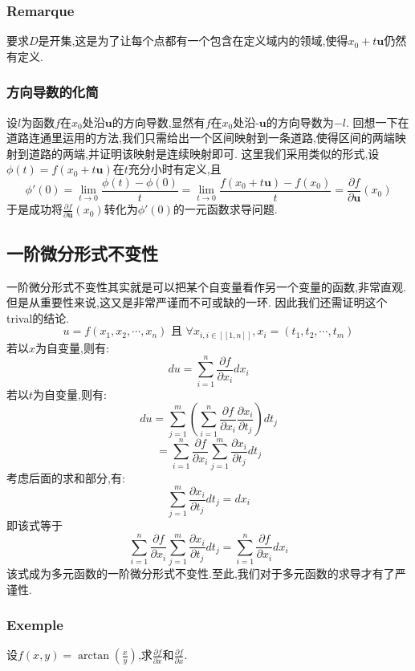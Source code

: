 \documentclass[12pt, a4paper, oneside]{ctexbook}
\begin{document}
    \subsubsection{Remarque}
    要求$D$是开集,这是为了让每个点都有一个包含在定义域内的领域,使得$x_0+t\textbf{u}$仍然有定义.
    \subsubsection{方向导数的化简}
    设$l$为函数$f$在$x_0$处沿$\textbf{u}$的方向导数,显然有$f$在$x_0$处沿$\textbf{-u}$的方向导数为$-l$.
    回想一下在道路连通里运用的方法,我们只需给出一个区间映射到一条道路,使得区间的两端映射到道路的两端,并证明该映射是连续映射即可.
    这里我们采用类似的形式,设$\phi(t)=f(x_0+t\textbf{u})$在$t$充分小时有定义,且
    $$
      \phi'(0)=\lim_{t \to 0} \frac{\phi(t)-\phi(0)}{t} =\lim_{t \to 0}\frac{f(x_0+t\textbf{u})-f(x_0)}{t}=\frac{\partial f}{\partial \textbf{u}}(x_0)
    $$
    于是成功将$\frac{\partial f}{\partial \textbf{u}}(x_0)$转化为$\phi'(0)$的一元函数求导问题. 
\subsection{一阶微分形式不变性}
    一阶微分形式不变性其实就是可以把某个自变量看作另一个变量的函数,非常直观.但是从重要性来说,这又是非常严谨而不可或缺的一环.
    因此我们还需证明这个trival的结论.
    $$
    u=f(x_1,x_2,\cdots,x_n) \text{ 且 }\forall x_{i,i\in [\![1,n]\!]}, x_i=(t_1,t_2,\cdots,t_m)
    $$
    若以$x$为自变量,则有:
    $$
      du=\sum_{i=1}^{n}\frac{\partial f}{\partial x_i}dx_i
    $$
    若以$t$为自变量,则有:
    $$
      du=\sum_{j=1}^{m}(\sum_{i=1}^{n}\frac{\partial f}{\partial x_i}\frac{\partial x_i}{\partial t_j})dt_j
    $$
    $$
      =\sum_{i=1}^{n}\frac{\partial f}{\partial x_i}\sum_{j=1}^{m}\frac{\partial x_i}{\partial t_j}dt_j
    $$
    考虑后面的求和部分,有:
    $$
    \sum_{j=1}^{m}\frac{\partial x_i}{\partial t_j}dt_j=dx_i
    $$
    即该式等于
    $$
    \sum_{i=1}^{n}\frac{\partial f}{\partial x_i}\sum_{j=1}^{m}\frac{\partial x_i}{\partial t_j}dt_j = \sum_{i=1}^{n}\frac{\partial f}{\partial x_i}dx_i
    $$
    该式成为多元函数的一阶微分形式不变性.至此,我们对于多元函数的求导才有了严谨性.
    \subsubsection{Exemple}
    设$f(x,y)=\arctan(\frac{x}{y})$,求$\frac{\partial f}{\partial x}$和$\frac{\partial f}{\partial x}$.\\
\end{document}
